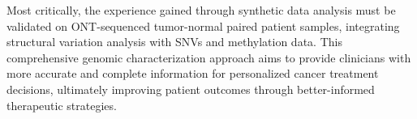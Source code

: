 Most critically, the experience gained through synthetic data analysis must be 
validated on ONT-sequenced tumor-normal paired patient samples, integrating 
structural variation analysis with SNVs and methylation data. This comprehensive 
genomic characterization approach aims to provide clinicians with more accurate 
and complete information for personalized cancer treatment decisions, ultimately 
improving patient outcomes through better-informed therapeutic strategies.




